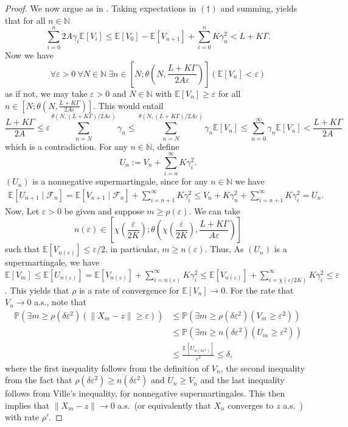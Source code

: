 \documentclass[12pt]{amsart}
\theoremstyle{definition}
\theoremstyle{remark}
\newcommand{\norm}[1]{\left\lVert#1\right\rVert}
\newcommand{\NN}{\mathbb{N}}
\newcommand{\PP}{\mathbb{P}}
\newcommand{\EE}{\mathbb{E}}
\begin{document}
\begin{proof}
We now argue as in \cite[Theorem 3.4]{NeriPischkePowell:fejer:rates}. Taking expectations in $(\dagger)$ and summing, yields that for all $n \in \NN$
    \[
    \sum_{i=0}^n2A\gamma_{i}\EE[V_{i}] \le \EE[V_0] - \EE[V_{n+1}] + \sum_{i=0}^nK\gamma_n^2 < L +K\Gamma.
    \]
Now we have 
\[
\forall\varepsilon>0\ \forall N\in\mathbb{N}\ \exists n\in \left[N;\theta\left(N,\frac{L +K\Gamma}{2A\varepsilon}\right)\right](\EE[V_n]<\varepsilon)
\]
as if not, we may take $\varepsilon>0$ and $N\in\NN$ with $\EE[V_n]\ge\varepsilon$ for all $n\in \left[N;\theta\left(N,\frac{L +K\Gamma}{2A\varepsilon}\right)\right]$. This would entail
\[
\frac{L +K\Gamma}{2A}\leq \varepsilon\sum_{n=N}^{\theta(N,(L+K\Gamma)/2A\varepsilon)} \gamma_n\le \sum_{n=N}^{\theta(N,(L+K\Gamma)/2A\varepsilon)} \gamma_n\EE[V_n]\leq \sum_{n=0}^{\infty} \gamma_n\EE[V_n]<\frac{L +K\Gamma}{2A}
\]
which is a contradiction. For any $n\in\mathbb{N}$, define
\[
U_{n}:=V_{n}+\sum_{i=n}^\infty K\gamma_i^2.
\]
$(U_{n})$ is a nonnegative supermartingale, since for any $n\in\mathbb{N}$ we have
\begin{align*}
\EE[U_{n+1}\mid\mathcal{F}_n]=\EE\left[V_{n+1}\mid\mathcal{F}_n\right]+\sum_{i=n+1}^\infty K\gamma_i^2
\leq V_n + K\gamma_n^2+\sum_{i=n+1}^\infty K\gamma_i^2
=U_{n}.
\end{align*}
Now, Let $\varepsilon >0$ be given and suppose $m \ge \rho(\varepsilon)$. We can take 
\[
n(\varepsilon)\in \left[\chi\left(\frac{\varepsilon}{2K}\right);\theta\left(\chi\left(\frac{\varepsilon}{2K}\right),\frac{L +K\Gamma}{A\varepsilon}\right)\right]
\]
such that $\EE[V_{n(\varepsilon)}]\le \varepsilon/2$, in particular, $m \ge n(\varepsilon)$. Thus, As $(U_n)$ is a supermartingale, we have $\EE[V_m] \le \EE[U_{n(\varepsilon)}] = \EE[V_{n(\varepsilon)}]+\sum_{i=n(\varepsilon)}^\infty K\gamma_i^2 \le \EE[V_{n(\varepsilon)}]+\sum_{i=\chi(\varepsilon/2K)}^\infty K\gamma_i^2\le \varepsilon$. This yields that $\rho$ is a rate of convergence for $\EE[V_n] \to 0$. For the rate that $V_n\to 0$ a.s., note that
\begin{align*}
\PP(\exists m\geq \rho(\delta\varepsilon^2)(\norm{X_m-z}\geq \varepsilon))& \leq \PP(\exists m\geq \rho(\delta\varepsilon^2)(V_m\geq \varepsilon^2))\\&
\leq \PP(\exists m\geq n(\delta\varepsilon^2)(U_{m}\geq \varepsilon^2))\\
&\leq \frac{\EE[U_{n(\delta\varepsilon^2)}]}{\varepsilon^2} \le \delta,
\end{align*}
where the first inequality follows from the definition of $V_n$, the second inequality from the fact that $\rho(\delta\varepsilon^2) \ge n(\delta\varepsilon^2)$ and $U_n \ge V_n$ and the last inequality follows from Ville's inequality, for nonnegative supermartingales. This then implies that $\norm{X_m-z}\to 0$ a.s.\ (or equivalently that $X_n$ converges to $z$ a.s.\ ) with rate $\rho'$.
\end{proof}
\end{document}
